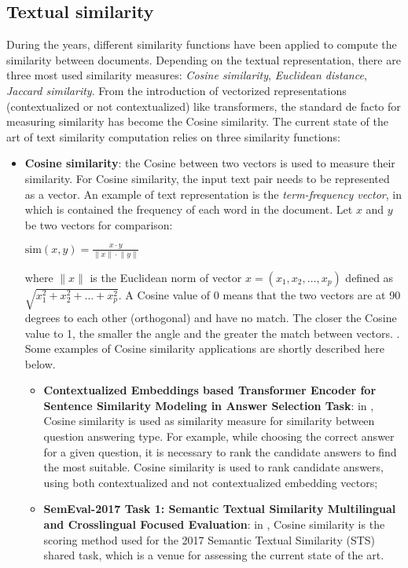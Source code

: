 \documentclass[\main/main.tex]{subfiles}
\begin{document}
\subsection{Textual similarity}
During the years, different similarity functions have been applied to compute the similarity between documents. Depending on the textual representation, there are three most used similarity measures: \emph{Cosine similarity}, \emph{Euclidean distance}, \emph{Jaccard similarity}. From the introduction of vectorized representations (contextualized or not contextualized) like transformers, the standard de facto for measuring similarity has become the Cosine similarity.
The current state of the art of text similarity computation relies on three similarity functions:
\begin{itemize}
    \item \textbf{Cosine similarity}: the Cosine between two vectors is used to measure their similarity. For Cosine similarity, the input text pair needs to be represented as a vector. An example of text representation is the \emph{term-frequency vector}, in which is contained the frequency of each word in the document. Let $x$ and $y$ be two vectors for comparison:
    \begin{center}
        $\mathrm{sim}(x, y) = \frac{x \cdot y}{\lVert x \rVert \cdot \lVert y \rVert}$
    \end{center}
    where $\lVert x \rVert$ is the Euclidean norm of vector $x = (x_1, x_2,\dots, x_p)$ defined as \\$\sqrt{x^2_1 + x^2_2 + \dots + x^2_p}$. A Cosine value of 0 means that the two vectors are at 90 degrees to each other (orthogonal) and have no match. The closer the Cosine value to 1, the smaller the angle and the greater the match between vectors. \cite{Cosine_HAN201239} \cite{Gomaa2013ASO}. Some examples of Cosine similarity applications are shortly described here below.
    \begin{itemize}
        \item \textbf{Contextualized Embeddings based Transformer Encoder for Sentence Similarity Modeling in Answer Selection Task}: in \cite{Laskar2020ContextualizedEB} , Cosine similarity is used as similarity measure for similarity between question answering type. For example, while choosing the correct answer for a given question, it is necessary to rank the candidate answers to find the most suitable. Cosine similarity is used to rank candidate answers, using both contextualized and not contextualized embedding vectors;
        \item \textbf{SemEval-2017 Task 1: Semantic Textual Similarity Multilingual and Crosslingual Focused Evaluation}: in \cite{Cer2017SemEval2017T1}, Cosine similarity is the scoring method used for the 2017 Semantic Textual Similarity (STS) shared task, which is a venue for assessing the current state of the art.

\end{itemize}
\end{itemize}
\end{document}
